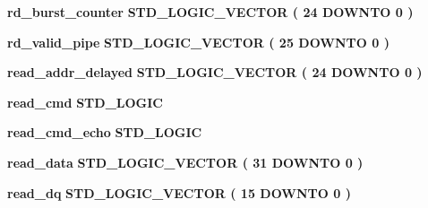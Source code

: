 \begin{DoxyCompactItemize}
\item 
{\bf rd\+\_\+burst\+\_\+counter} {\bfseries \textcolor{comment}{S\+T\+D\+\_\+\+L\+O\+G\+I\+C\+\_\+\+V\+E\+C\+T\+OR}\textcolor{vhdlchar}{ }\textcolor{vhdlchar}{(}\textcolor{vhdlchar}{ }\textcolor{vhdlchar}{ } \textcolor{vhdldigit}{24} \textcolor{vhdlchar}{ }\textcolor{keywordflow}{D\+O\+W\+N\+TO}\textcolor{vhdlchar}{ }\textcolor{vhdlchar}{ } \textcolor{vhdldigit}{0} \textcolor{vhdlchar}{ }\textcolor{vhdlchar}{)}\textcolor{vhdlchar}{ }} 
\item 
{\bf rd\+\_\+valid\+\_\+pipe} {\bfseries \textcolor{comment}{S\+T\+D\+\_\+\+L\+O\+G\+I\+C\+\_\+\+V\+E\+C\+T\+OR}\textcolor{vhdlchar}{ }\textcolor{vhdlchar}{(}\textcolor{vhdlchar}{ }\textcolor{vhdlchar}{ } \textcolor{vhdldigit}{25} \textcolor{vhdlchar}{ }\textcolor{keywordflow}{D\+O\+W\+N\+TO}\textcolor{vhdlchar}{ }\textcolor{vhdlchar}{ } \textcolor{vhdldigit}{0} \textcolor{vhdlchar}{ }\textcolor{vhdlchar}{)}\textcolor{vhdlchar}{ }} 
\item 
{\bf read\+\_\+addr\+\_\+delayed} {\bfseries \textcolor{comment}{S\+T\+D\+\_\+\+L\+O\+G\+I\+C\+\_\+\+V\+E\+C\+T\+OR}\textcolor{vhdlchar}{ }\textcolor{vhdlchar}{(}\textcolor{vhdlchar}{ }\textcolor{vhdlchar}{ } \textcolor{vhdldigit}{24} \textcolor{vhdlchar}{ }\textcolor{keywordflow}{D\+O\+W\+N\+TO}\textcolor{vhdlchar}{ }\textcolor{vhdlchar}{ } \textcolor{vhdldigit}{0} \textcolor{vhdlchar}{ }\textcolor{vhdlchar}{)}\textcolor{vhdlchar}{ }} 
\item 
{\bf read\+\_\+cmd} {\bfseries \textcolor{comment}{S\+T\+D\+\_\+\+L\+O\+G\+IC}\textcolor{vhdlchar}{ }} 
\item 
{\bf read\+\_\+cmd\+\_\+echo} {\bfseries \textcolor{comment}{S\+T\+D\+\_\+\+L\+O\+G\+IC}\textcolor{vhdlchar}{ }} 
\item 
{\bf read\+\_\+data} {\bfseries \textcolor{comment}{S\+T\+D\+\_\+\+L\+O\+G\+I\+C\+\_\+\+V\+E\+C\+T\+OR}\textcolor{vhdlchar}{ }\textcolor{vhdlchar}{(}\textcolor{vhdlchar}{ }\textcolor{vhdlchar}{ } \textcolor{vhdldigit}{31} \textcolor{vhdlchar}{ }\textcolor{keywordflow}{D\+O\+W\+N\+TO}\textcolor{vhdlchar}{ }\textcolor{vhdlchar}{ } \textcolor{vhdldigit}{0} \textcolor{vhdlchar}{ }\textcolor{vhdlchar}{)}\textcolor{vhdlchar}{ }} 
\item 
{\bf read\+\_\+dq} {\bfseries \textcolor{comment}{S\+T\+D\+\_\+\+L\+O\+G\+I\+C\+\_\+\+V\+E\+C\+T\+OR}\textcolor{vhdlchar}{ }\textcolor{vhdlchar}{(}\textcolor{vhdlchar}{ }\textcolor{vhdlchar}{ } \textcolor{vhdldigit}{15} \textcolor{vhdlchar}{ }\textcolor{keywordflow}{D\+O\+W\+N\+TO}\textcolor{vhdlchar}{ }\textcolor{vhdlchar}{ } \textcolor{vhdldigit}{0} \textcolor{vhdlchar}{ }\textcolor{vhdlchar}{)}\textcolor{vhdlchar}{ }} 

\end{DoxyCompactItemize}
